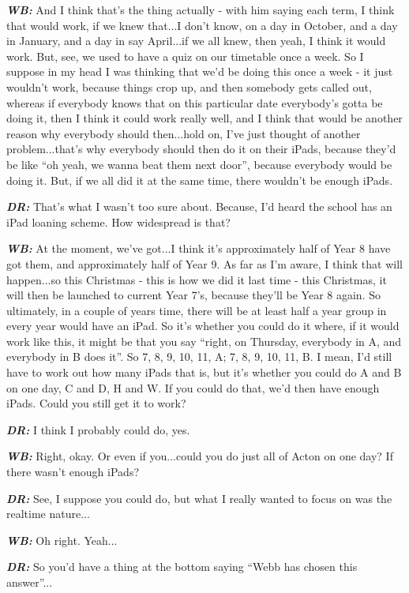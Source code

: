 \textit{\textbf{WB:}} And I think that's the thing actually - with him saying each term, I think that would work, if we knew that...I don't know, on a day in October, and a day in January, and a day in say April...if we all knew, then yeah, I think it would work. But, see, we used to have a quiz on our timetable once a week. So I suppose in my head I was thinking that we'd be doing this once a week - it just wouldn't work, because things crop up, and then somebody gets called out, whereas if everybody knows that on this particular date everybody's gotta be doing it, then I think it could work really well, and I think that would be another reason why everybody should then...hold on, I've just thought of another problem...that's why everybody should then do it on their iPads, because they'd be like ``oh yeah, we wanna beat them next door'', because everybody would be doing it. But, if we all did it at the same time, there wouldn't be enough iPads.

\textit{\textbf{DR:}} That's what I wasn't too sure about. Because, I'd heard the school has an iPad loaning scheme. How widespread is that?

\textit{\textbf{WB:}} At the moment, we've got...I think it's approximately half of Year 8 have got them, and approximately half of Year 9. As far as I'm aware, I think that will happen...so this Christmas - this is how we did it last time - this Christmas, it will then be launched to current Year 7's, because they'll be Year 8 again. So ultimately, in a couple of years time, there will be at least half a year group in every year would have an iPad. So it's whether you could do it where, if it would work like this, it might be that you say ``right, on Thursday, everybody in A, and everybody in B does it''. So 7, 8, 9, 10, 11, A; 7, 8, 9, 10, 11, B. I mean, I'd still have to work out how many iPads that is, but it's whether you could do A and B on one day, C and D, H and W. If you could do that, we'd then have enough iPads. Could you still get it to work?

\textit{\textbf{DR:}} I think I probably could do, yes.

\textit{\textbf{WB:}} Right, okay. Or even if you...could you do just all of Acton on one day? If there wasn't enough iPads?

\textit{\textbf{DR:}} See, I suppose you could do, but what I really wanted to focus on was the realtime nature...

\textit{\textbf{WB:}} Oh right. Yeah...

\textit{\textbf{DR:}} So you'd have a thing at the bottom saying ``Webb has chosen this answer''...

